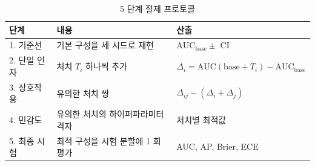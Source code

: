 \begin{table}[htbp]
  \centering
  \caption{5 단계 절제 프로토콜}
  \label{tab:protocol}
  \small
  \begin{tabular}{@{}lll@{}}
    \toprule
    단계 & 내용 & 산출 \\
    \midrule
    1. 기준선 & 기본 구성을 세 시드로 재현 & $\mathrm{AUC}_{\mathrm{base}} \pm$ CI \\
    2. 단일 인자 & 처치 $T_i$ 하나씩 추가 & $\Delta_i = \mathrm{AUC}(\mathrm{base} + T_i) - \mathrm{AUC}_{\mathrm{base}}$ \\
    3. 상호작용 & 유의한 처치 쌍 & $\Delta_{ij} - (\Delta_i + \Delta_j)$ \\
    4. 민감도 & 유의한 처치의 하이퍼파라미터 격자 & 처치별 최적값 \\
    5. 최종 시험 & 최적 구성을 시험 분할에 1 회 평가 & AUC, AP, Brier, ECE \\
    \bottomrule
  \end{tabular}
\end{table}
